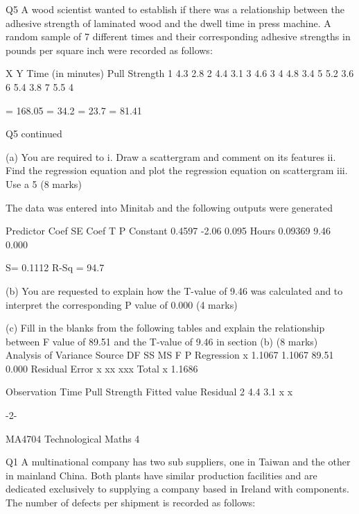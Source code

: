 \documentclass[]{report}
\begin{document}
\begin{enumerate}[(i)]
\begin{itemize}
	
	Q5
	A wood scientist wanted to establish if there was a relationship between the adhesive strength of laminated wood and the dwell time in press machine. A random sample of 7 different times and their corresponding adhesive strengths in pounds per square inch were recorded as follows:
	
	
	X	Y
	Time (in minutes)	Pull Strength
	1	4.3	2.8
	2	4.4	3.1
	3	4.6	3
	4	4.8	3.4
	5	5.2	3.6
	6	5.4	3.8
	7	5.5	4
	
		  = 168.05	 \sumx = 34.2	\sumy = 23.7       = 81.41
	
	Q5 continued
	
	(a) 	You are required to 
	i.	Draw a scattergram and comment on its features
	ii.	Find the regression equation and plot the regression equation on scattergram
	iii.	Use a 5%
	(8 marks)
	
	The data was entered into Minitab and the following outputs were generated
	
	Predictor	Coef		SE Coef	T		P
	Constant			0.4597		-2.06		0.095
	Hours				0.09369	 9.46		0.000
	
	S= 0.1112	R-Sq = 94.7%
	
	
	(b) 	You are requested to explain how the T-value of 9.46 was calculated and to 
	interpret the corresponding P value of 0.000
	(4 marks)
	
	
	
	(c)	Fill in the blanks from the following tables and explain the relationship between F value of 89.51 and the T-value of 9.46 in section (b)
	(8 marks)
	Analysis of Variance
	Source			DF		SS		MS		F		P
	Regression		x		1.1067		1.1067		89.51		0.000
	Residual Error		x		xx		xxx		
	Total			x		1.1686
	
	
	
	Observation		Time		Pull Strength		Fitted value	Residual
	2			4.4		3.1			x		x
	
	
	-2-
	
	MA4704 Technological Maths 4 
	
	Q1
	A multinational company has two sub suppliers, one in Taiwan and the other in mainland China.  Both plants have similar production facilities and are dedicated exclusively to supplying a company based in Ireland with components.
	The number of defects per shipment is recorded as follows:
	

\end{itemize}
\end{enumerate}
\end{document}
